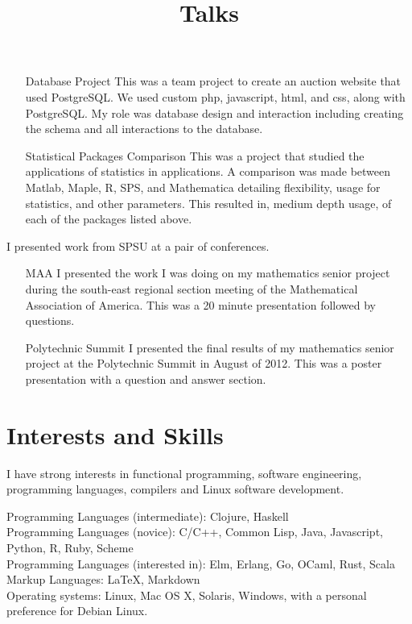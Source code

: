 \documentclass[margintitle,line]{res}
\begin{document}
\begin{resume}
\begin{position}
\begin{itemize}
\item[Database Project] This was a team project to create an auction website that used PostgreSQL. We used custom php, javascript, html, and css, along with PostgreSQL. My role was database design and interaction including creating the schema and all interactions to the database.

\item[Statistical Packages Comparison] This was a project that studied the applications of statistics in applications. A comparison was made between Matlab, Maple, R, SPS, and Mathematica detailing flexibility, usage for statistics, and other parameters. This resulted in, medium depth usage, of each of the packages listed above.
\end{itemize}
\end{position}


\title{Talks}
\begin{position}
I presented work from SPSU at a pair of conferences.
\begin{itemize}
\item[MAA] I presented the work I was doing on my mathematics senior project during the south-east regional section meeting of the Mathematical Association of America. This was a 20 minute presentation followed by questions.
\item[Polytechnic Summit] I presented the final results of my mathematics senior project at the Polytechnic Summit in August of 2012. This was a poster presentation with a question and answer section.
\end{itemize}
\end{position}

\section{Interests and Skills}

I have strong interests in functional programming, software engineering, programming languages, compilers and Linux software development.

Programming Languages (intermediate): Clojure, Haskell \\
Programming Languages (novice): C/C++, Common Lisp, Java, Javascript, Python, R, Ruby, Scheme \\
Programming Languages (interested in): Elm, Erlang, Go, OCaml, Rust, Scala \\
Markup Languages: LaTeX, Markdown \\
Operating systems: Linux, Mac OS X, Solaris, Windows, with a personal preference for Debian Linux.


\end{resume}
\end{document}
